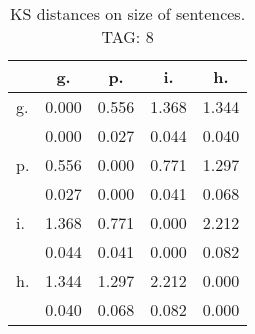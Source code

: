 \begin{table}[h!]
\begin{center}
\begin{tabular}{| l | c | c | c | c |}\hline
 & g. & p. & i. & h. \\\hline
g. & 0.000  & 0.556  & 1.368  & 1.344 \\\hline
 & 0.000  & 0.027  & 0.044  & 0.040 \\\hline
p. & 0.556  & 0.000  & 0.771  & 1.297 \\\hline
 & 0.027  & 0.000  & 0.041  & 0.068 \\\hline
i. & 1.368  & 0.771  & 0.000  & 2.212 \\\hline
 & 0.044  & 0.041  & 0.000  & 0.082 \\\hline
h. & 1.344  & 1.297  & 2.212  & 0.000 \\\hline
 & 0.040  & 0.068  & 0.082  & 0.000 \\\hline
\end{tabular}
\caption{KS distances on size of sentences. TAG: 8}
\end{center}
\end{table}